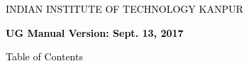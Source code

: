 \documentclass[12pt]{article}
\begin{document}
\vspace{\baselineskip}

\vspace{\baselineskip}

\vspace{\baselineskip}

\vspace{\baselineskip}

\vspace{\baselineskip}

\vspace{\baselineskip}

\vspace{\baselineskip}

\vspace{\baselineskip}

\vspace{\baselineskip}

\vspace{\baselineskip}

\vspace{\baselineskip}

\vspace{\baselineskip}

\vspace{\baselineskip}

\vspace{\baselineskip}

\vspace{\baselineskip}

\vspace{\baselineskip}

\vspace{\baselineskip}
\begin{Center}
{\fontsize{18pt}{21.6pt}\selectfont \textcolor[HTML]{00000A}{INDIAN INSTITUTE OF TECHNOLOGY KANPUR}\par}
\end{Center}\par


\vspace{\baselineskip}

\vspace{\baselineskip}
\begin{Center}
{\fontsize{10pt}{12.0pt}\selectfont \textbf{\textcolor[HTML]{00000A}{UG Manual Version: Sept. 13, 2017}}\par}
\end{Center}\par


\vspace{\baselineskip}
\begin{adjustwidth}{2.85in}{0.0in}
{\fontsize{14pt}{16.8pt}\selectfont \textcolor[HTML]{00000A}{Table of Contents}\par}\par

\end{adjustwidth}
\end{document}
